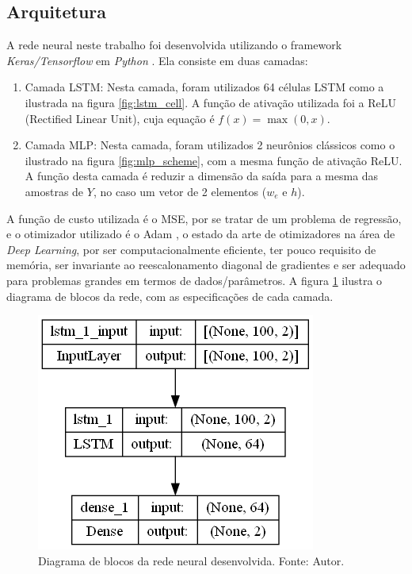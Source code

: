 \subsection{Arquitetura}
A rede neural neste trabalho foi desenvolvida utilizando o framework \textit{Keras/Tensorflow} em \textit{Python} \cite{tensorflow2015}. Ela consiste em duas camadas:
\begin{enumerate}
    \item Camada LSTM: Nesta camada, foram utilizados 64 células LSTM como a ilustrada na figura \ref{fig:lstm_cell}. A função de ativação utilizada foi a ReLU (Rectified Linear Unit), cuja equação é $f(x) = \max(0,x)$.
    \item Camada MLP: Nesta camada, foram utilizados 2 neurônios clássicos como o ilustrado na figura \ref{fig:mlp_scheme}, com a mesma função de ativação ReLU. A função desta camada é reduzir a dimensão da saída para a mesma das amostras de $Y$, no caso um vetor de 2 elementos ($w_e$ e $h$).
\end{enumerate}
A função de custo utilizada é o MSE, por se tratar de um problema de regressão, e o otimizador utilizado é o Adam \cite{kingma2014adam}, o estado da arte de otimizadores na área de \textit{Deep Learning}, por ser computacionalmente eficiente, ter pouco requisito de memória, ser invariante ao reescalonamento diagonal de gradientes e ser adequado para problemas grandes em termos de dados/parâmetros. A figura \ref{fig:model_summary} ilustra o diagrama de blocos da rede, com as especificações de cada camada.

\begin{figure}[hbt!]
    \centering
    \includegraphics[width=0.4\linewidth]{Imagens/chap03/model_summary.png}
    \caption{Diagrama de blocos da rede neural desenvolvida. Fonte: Autor.}
    \label{fig:model_summary}
\end{figure}

